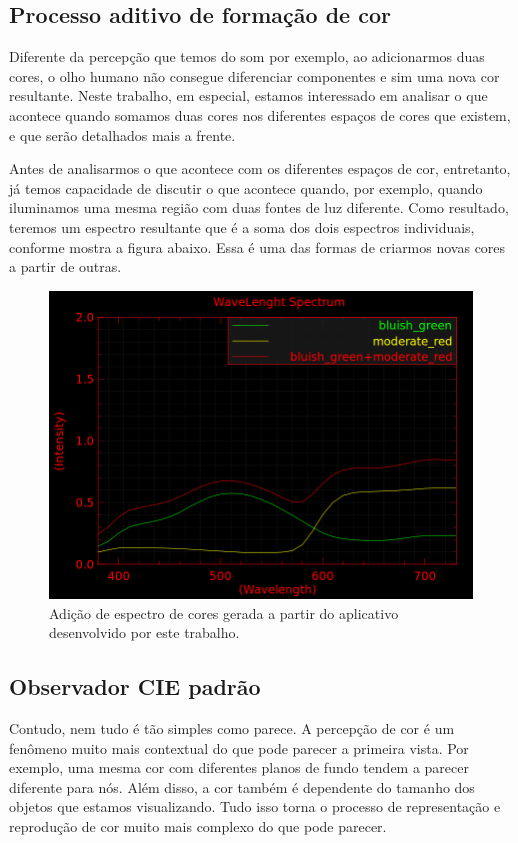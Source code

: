 \documentclass[a4paper,10pt]{report}
\begin{document}
\subsection{Processo aditivo de formação de cor}
\par
Diferente da percepção que temos do som por exemplo, ao adicionarmos duas cores,
o olho humano não consegue diferenciar componentes e sim uma nova cor
resultante. Neste trabalho, em especial, estamos interessado em analisar o que
acontece quando somamos duas cores nos diferentes espaços de cores que existem,
e que serão detalhados mais a frente.

\par
Antes de analisarmos o que acontece com os diferentes espaços de cor,
entretanto, já temos capacidade de discutir o que acontece quando, por exemplo,
quando iluminamos uma mesma região com duas fontes de luz diferente. Como
resultado, teremos um espectro resultante que é a soma dos dois espectros
individuais, conforme mostra a figura abaixo. Essa é uma das formas de criarmos
novas cores a partir de outras.

\begin{figure}[!htb]
     \centering
     \includegraphics[scale=0.6]{img/color_addition.png}
     \caption{Adição de espectro de cores gerada a partir do aplicativo
desenvolvido por este trabalho.}
     \label{fig:color_addition}
\end{figure}

\subsection{Observador CIE padrão}
\par
Contudo, nem tudo é tão simples como parece. A percepção de cor é um fenômeno
muito mais contextual do que pode parecer a primeira vista. Por exemplo, uma
mesma cor com diferentes planos de fundo tendem a parecer diferente para nós.
Além disso, a cor também é dependente do tamanho dos objetos que estamos
visualizando. Tudo isso torna o processo de representação e reprodução de cor
muito mais complexo do que pode parecer.
\end{document}
